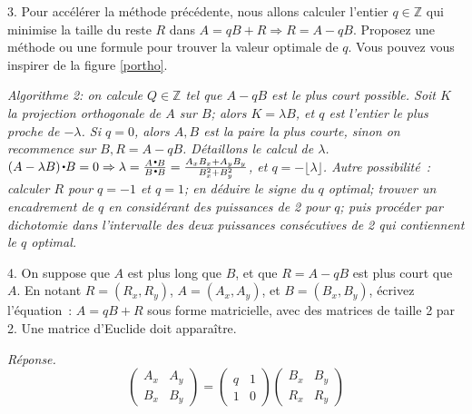 \documentclass[11pt]{article}
\def\Z{\mathbb Z}
\begin{document}
{3. Pour accélérer la méthode précédente, nous allons calculer l'entier $q\in \Z$ qui minimise la taille du reste $R$ dans $A=qB+R \Rightarrow  R=A-qB$.
Proposez une méthode ou une formule pour trouver la valeur optimale de $q$.
Vous pouvez vous inspirer de la figure \ref{portho}.

{
\ifcorrige

{
\medskip
{\it Algorithme 2: on calcule $Q\in \Z$ tel que $A-qB$ est le plus court possible. 
Soit $K$ la projection orthogonale de $A$ sur $B$; alors $K=\lambda B$, et
$q$ est l'entier le plus proche de $-\lambda$.  
Si 
$q=0$, alors $A, B$ est la paire la plus courte, sinon on recommence sur
$B, R=A-qB$.
Détaillons le calcul de $\lambda$. $(A-\lambda B) \smallbullet B=0 \Rightarrow \lambda=\frac{A \smallbullet B}{ B \smallbullet B}=\frac{A_x B_x + A_y B_y}{B_x^ 2 +B_y^ 2}$, et $q= - \lfloor \lambda \rfloor$.
Autre possibilité~: calculer $R$ pour $q= -1$ et $q=1$; en déduire le signe du $q$ optimal; trouver un encadrement de $q$ en considérant des puissances de 2 pour $q$; puis procéder par dichotomie dans l'intervalle des deux puissances consécutives de 2 qui contiennent le $q$ optimal.
}

\medskip
}
\else
\fi
}

4. On suppose  que $A$ est plus long que $B$, et
que $R=A-qB$ est plus court que $A$.
En notant $R=(R_x, R_y)$, $A=(A_x, A_y)$, et $B=(B_x, B_y)$, 
 écrivez l'équation~: $A=qB+R$ sous forme matricielle, avec des matrices de taille 2 par 2.
Une matrice d'Euclide doit apparaître.


{
\ifcorrige

\medskip

{\it  Réponse.
$$\left( \begin{array}{cc} A_x & A_y \\
B_x & B_y \end{array}\right) = \left( \begin{array}{cc} q & 1 \\
1 & 0 \end{array}\right) \left( \begin{array}{cc}  B_x & B_y \\
R_x & R_y \end{array}\right)$$

}}}
\end{document}
